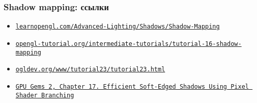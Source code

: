 \documentclass{beamer}
\begin{document}
\begin{frame}[fragile]
\frametitle{Shadow mapping: ссылки}
\begin{itemize}
\item \href{https://learnopengl.com/Advanced-Lighting/Shadows/Shadow-Mapping}{\nolinkurl{learnopengl.com/Advanced-Lighting/Shadows/Shadow-Mapping}}
\item \href{http://www.opengl-tutorial.org/intermediate-tutorials/tutorial-16-shadow-mapping}{\nolinkurl{opengl-tutorial.org/intermediate-tutorials/tutorial-16-shadow-mapping}}
\item \href{https://ogldev.org/www/tutorial23/tutorial23.html}{\nolinkurl{ogldev.org/www/tutorial23/tutorial23.html}}
\item \href{https://developer.nvidia.com/gpugems/gpugems2/part-ii-shading-lighting-and-shadows/chapter-17-efficient-soft-edged-shadows-using}{\texttt{GPU Gems 2, Chapter 17. Efficient Soft-Edged Shadows Using Pixel Shader Branching}}
\end{itemize}
\end{frame}
\end{document}
